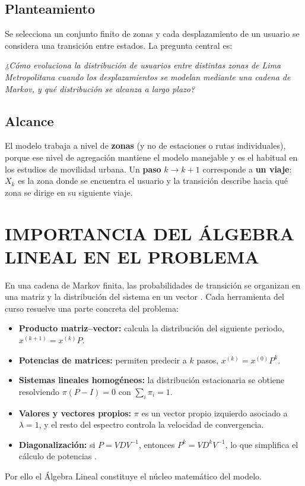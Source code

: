 \documentclass[12pt]{article}
\begin{document}
\subsection{Planteamiento}
Se selecciona un conjunto finito de zonas y cada desplazamiento de un usuario se considera una
transición entre estados. La pregunta central es:

\vspace{0.3cm}
{\itshape ¿Cómo evoluciona la distribución de usuarios entre distintas zonas de Lima
    Metropolitana cuando los desplazamientos se modelan mediante una cadena de Markov, y qué
    distribución se alcanza a largo plazo?}
\vspace{0.3cm}

\subsection{Alcance}
El modelo trabaja a nivel de \textbf{zonas} (y no de estaciones o rutas individuales), porque ese nivel de agregación mantiene el modelo manejable y es el habitual en los estudios de movilidad urbana. Un \textbf{paso} $k \to k+1$ corresponde a \textbf{un viaje}: $X_k$ es la zona donde se encuentra el usuario y la transición describe hacia qué zona se dirige en su siguiente viaje.

\newpage

\section{IMPORTANCIA DEL ÁLGEBRA LINEAL EN EL PROBLEMA}
En una cadena de Markov finita, las probabilidades de transición se organizan en una matriz y la
distribución del sistema en un vector \cite{meyer,strang}. Cada herramienta del curso resuelve una
parte concreta del problema:
\begin{itemize}
    \item \textbf{Producto matriz--vector:} calcula la distribución del siguiente periodo,
          $x^{(k+1)}=x^{(k)}P$.
    \item \textbf{Potencias de matrices:} permiten predecir a $k$ pasos, $x^{(k)}=x^{(0)}P^k$.
    \item \textbf{Sistemas lineales homogéneos:} la distribución estacionaria se obtiene
          resolviendo $\pi(P-I)=0$ con $\sum_i\pi_i=1$.
    \item \textbf{Valores y vectores propios:} $\pi$ es un vector propio izquierdo asociado a
          $\lambda=1$, y el resto del espectro controla la velocidad de convergencia.
    \item \textbf{Diagonalización:} si $P=VDV^{-1}$, entonces $P^k=VD^kV^{-1}$, lo que
          simplifica el cálculo de potencias \cite{lay,meyer}.
\end{itemize}
Por ello el Álgebra Lineal constituye el núcleo matemático del modelo.
\end{document}
